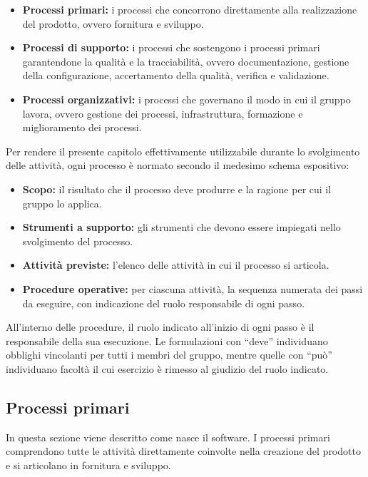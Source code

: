 \documentclass[a4paper,12pt]{article}
\begin{document}
\begin{itemize}
    \item \textbf{Processi primari:} i processi che concorrono direttamente alla realizzazione del prodotto, ovvero fornitura e sviluppo.
    \item \textbf{Processi di supporto:} i processi che sostengono i processi primari garantendone la qualità e la tracciabilità, ovvero documentazione, gestione della configurazione, accertamento della qualità, verifica e validazione.
    \item \textbf{Processi organizzativi:} i processi che governano il modo in cui il gruppo lavora, ovvero gestione dei processi, infrastruttura, formazione e miglioramento dei processi.
\end{itemize}

Per rendere il presente capitolo effettivamente utilizzabile durante lo svolgimento delle attività, ogni processo è normato secondo il medesimo schema espositivo:

\begin{itemize}
    \item \textbf{Scopo:} il risultato che il processo deve produrre e la ragione per cui il gruppo lo applica.
    \item \textbf{Strumenti a supporto:} gli strumenti che devono essere impiegati nello svolgimento del processo.
    \item \textbf{Attività previste:} l'elenco delle attività in cui il processo si articola.
    \item \textbf{Procedure operative:} per ciascuna attività, la sequenza numerata dei passi da eseguire, con indicazione del ruolo responsabile di ogni passo.
\end{itemize}

All'interno delle procedure, il ruolo indicato all'inizio di ogni passo è il responsabile della sua esecuzione. Le formulazioni con ``deve'' individuano obblighi vincolanti per tutti i membri del gruppo, mentre quelle con ``può'' individuano facoltà il cui esercizio è rimesso al giudizio del ruolo indicato.

\subsection{Processi primari}
In questa sezione viene descritto come nasce il software. I processi primari comprendono tutte le attività direttamente coinvolte nella creazione del prodotto e si articolano in fornitura e sviluppo.
\end{document}
